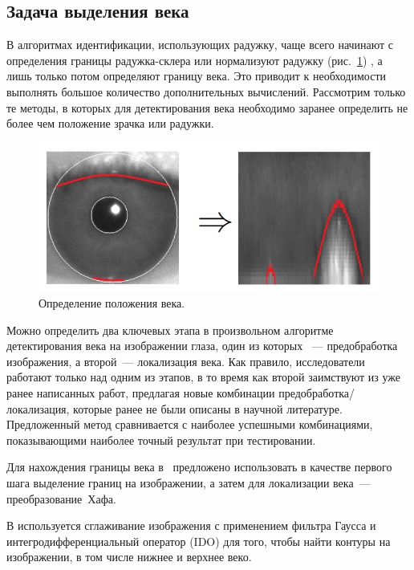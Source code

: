 \documentclass[12pt,a4paper]{article} %
\begin{document}
\subsection{Задача выделения века}\label{task}
В алгоритмах идентификации, использующих радужку, чаще всего начинают с определения границы радужка-склера \cite{Adam_1, Daugman, Matv} или нормализуют радужку (рис.~\ref{fig:glaz3}) \cite{Min}, а лишь только потом определяют границу века. Это приводит к необходимости выполнять большое количество дополнительных вычислений. Рассмотрим только те методы, в которых для детектирования века необходимо заранее определить не более чем положение зрачка или радужки.

\begin{figure}[h]
	
	\centering
	
	\includegraphics[width=0.8\linewidth]{glaz3.jpg}
	
	\caption{Определение положения века.}
	
	\label{fig:glaz3}
	
\end{figure}

Можно определить два ключевых этапа в произвольном алгоритме детектирования века на изображении глаза, один из которых ~--- предобработка изображения, а второй~--- локализация века. Как правило, исследователи работают только над одним из этапов, в то время как второй заимствуют из уже ранее написанных работ, предлагая новые комбинации предобработка/локализация, которые ранее не были описаны в научной литературе. Предложенный метод сравнивается с наиболее успешными комбинациями, показывающими наиболее точный результат при тестировании.

Для нахождения границы века в~\cite{Wildes} предложено использовать в качестве первого шага выделение границ на изображении, а затем для локализации века~--- преобразование~Хафа. 

В \cite{Daugman} используется сглаживание изображения с применением фильтра Гаусса и интегродифференциальный оператор
(IDO) для того, чтобы найти контуры на изображении, в том числе нижнее и верхнее веко.
\end{document}
